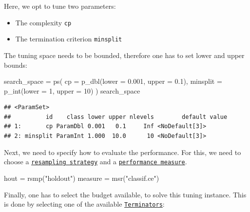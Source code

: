\documentclass[
]{scrbook}
\newenvironment{Shaded}{\begin{snugshade}}{\end{snugshade}}
\newcommand{\AttributeTok}[1]{\textcolor[rgb]{0.77,0.63,0.00}{#1}}
\newcommand{\DecValTok}[1]{\textcolor[rgb]{0.00,0.00,0.81}{#1}}
\newcommand{\FloatTok}[1]{\textcolor[rgb]{0.00,0.00,0.81}{#1}}
\newcommand{\FunctionTok}[1]{\textcolor[rgb]{0.00,0.00,0.00}{#1}}
\newcommand{\NormalTok}[1]{#1}
\newcommand{\OtherTok}[1]{\textcolor[rgb]{0.56,0.35,0.01}{#1}}
\newcommand{\StringTok}[1]{\textcolor[rgb]{0.31,0.60,0.02}{#1}}
\providecommand{\tightlist}{%
  \setlength{\itemsep}{0pt}\setlength{\parskip}{0pt}}
\renewenvironment{Shaded} {\begin{snugshade}\small} {\end{snugshade}}
\begin{document}
Here, we opt to tune two parameters:

\begin{itemize}
\tightlist
\item
  The complexity \texttt{cp}
\item
  The termination criterion \texttt{minsplit}
\end{itemize}

The tuning space needs to be bounded, therefore one has to set lower and upper bounds:

\begin{Shaded}
\begin{Highlighting}[]
\NormalTok{search\_space }\OtherTok{=} \FunctionTok{ps}\NormalTok{(}
  \AttributeTok{cp =} \FunctionTok{p\_dbl}\NormalTok{(}\AttributeTok{lower =} \FloatTok{0.001}\NormalTok{, }\AttributeTok{upper =} \FloatTok{0.1}\NormalTok{),}
  \AttributeTok{minsplit =} \FunctionTok{p\_int}\NormalTok{(}\AttributeTok{lower =} \DecValTok{1}\NormalTok{, }\AttributeTok{upper =} \DecValTok{10}\NormalTok{)}
\NormalTok{)}
\NormalTok{search\_space}
\end{Highlighting}
\end{Shaded}

\begin{verbatim}
## <ParamSet>
##          id    class lower upper nlevels        default value
## 1:       cp ParamDbl 0.001   0.1     Inf <NoDefault[3]>      
## 2: minsplit ParamInt 1.000  10.0      10 <NoDefault[3]>
\end{verbatim}

Next, we need to specify how to evaluate the performance.
For this, we need to choose a \href{https://mlr3.mlr-org.com/reference/Resampling.html}{\texttt{resampling\ strategy}} and a \href{https://mlr3.mlr-org.com/reference/Measure.html}{\texttt{performance\ measure}}.

\begin{Shaded}
\begin{Highlighting}[]
\NormalTok{hout }\OtherTok{=} \FunctionTok{rsmp}\NormalTok{(}\StringTok{"holdout"}\NormalTok{)}
\NormalTok{measure }\OtherTok{=} \FunctionTok{msr}\NormalTok{(}\StringTok{"classif.ce"}\NormalTok{)}
\end{Highlighting}
\end{Shaded}

Finally, one has to select the budget available, to solve this tuning instance.
This is done by selecting one of the available \href{https://bbotk.mlr-org.com/reference/Terminator.html}{\texttt{Terminators}}:
\end{document}
